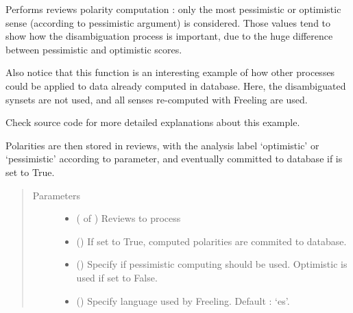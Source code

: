 \documentclass[letterpaper,10pt,english]{sphinxmanual}
\begin{document}
\begin{fulllineitems}
\label{\detokenize{analysis:loacore.analysis.sentiment_analysis.compute_extreme_reviews_polarity}}
Performs  reviews polarity computation : only the most pessimistic or optimistic sense
(according to pessimistic argument) is considered. Those values tend to show how the disambiguation process is
important, due to the huge difference between pessimistic and optimistic scores.

Also notice that this function is an interesting example of how other processes could be applied to data already
computed in database. Here, the disambiguated synsets are not used, and all senses re-computed with Freeling are
used.

Check source code for more detailed explanations about this example.

Polarities are then stored in reviews, with the analysis label ‘optimistic’ or ‘pessimistic’ according to
 parameter, and eventually committed to database if  is set to True.
\begin{quote}\begin{description}
\item[{Parameters}] \leavevmode\begin{itemize}
\item {} 
 ( of ) \textendash{} Reviews to process

\item {} 
 () \textendash{} If set to True, computed polarities are commited to database.

\item {} 
 () \textendash{} Specify if pessimistic computing should be used. Optimistic is used if set to False.

\item {} 
 () \textendash{} 
Specify language used by Freeling. Default : ‘es’.


\end{itemize}
\end{description}
\end{quote}
\end{fulllineitems}
\end{document}
